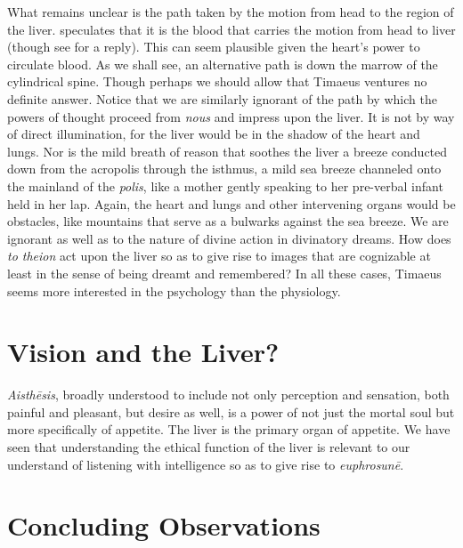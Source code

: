 What remains unclear is the path taken by the motion from head to the region of the liver. \citet{Brisson:1997qr} speculates that it is the blood that carries the motion from head to liver (though see \citealt{Miller:1997up} for a reply). This can seem plausible given the heart's power to circulate blood. As we shall see, an alternative path is down the marrow of the cylindrical spine. Though perhaps we should allow that Timaeus ventures no definite answer. Notice that we are similarly ignorant of the path by which the powers of thought proceed from \emph{nous} and impress upon the liver. It is not by way of direct illumination, for the liver would be in the shadow of the heart and lungs. Nor is the mild breath of reason that soothes the liver a breeze conducted down from the acropolis through the isthmus, a mild sea breeze channeled onto the mainland of the \emph{polis}, like a mother gently speaking to her pre-verbal infant held in her lap. Again, the heart and lungs and other intervening organs would be obstacles, like mountains that serve as a bulwarks against the sea breeze. We are ignorant as well as to the nature of divine action in divinatory dreams. How does \emph{to theion} act upon the liver so as to give rise to images that are cognizable at least in the sense of being dreamt and remembered? In all these cases, Timaeus seems more interested in the psychology than the physiology.


\section{Vision and the Liver?} %
\label{sec:vision_and_the_liver}

\emph{Aisthēsis}, broadly understood to include not only perception and sensation, both painful and pleasant, but desire as well, is a power of not just the mortal soul but more specifically of appetite. The liver is the primary organ of appetite. We have seen that understanding the ethical function of the liver is relevant to our understand of listening with intelligence so as to give rise to \emph{euphrosunē}.


\section{Concluding Observations} %
\label{sec:concluding_observations}

